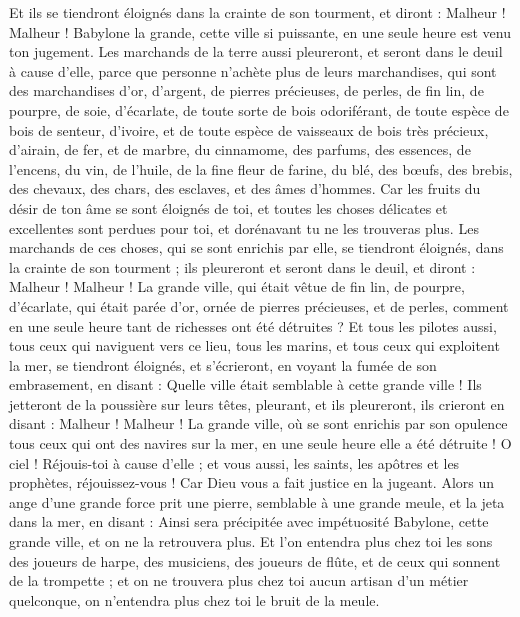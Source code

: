 \begin{multicols}{2}
Et ils se tiendront éloignés dans la crainte de son tourment, et diront : Malheur ! Malheur ! Babylone la grande, cette ville si puissante, en une seule heure est venu ton jugement.
Les marchands de la terre aussi pleureront, et seront dans le deuil à cause d'elle, parce que personne n'achète plus de leurs marchandises,
qui sont des marchandises d'or, d'argent, de pierres précieuses, de perles, de fin lin, de pourpre, de soie, d'écarlate, de toute sorte de bois odoriférant, de toute espèce de bois de senteur, d'ivoire, et de toute espèce de vaisseaux de bois très précieux, d'airain, de fer, et de marbre,
du cinnamome, des parfums, des essences, de l'encens, du vin, de l'huile, de la fine fleur de farine, du blé, des bœufs, des brebis, des chevaux, des chars, des esclaves, et des âmes d'hommes.
Car les fruits du désir de ton âme se sont éloignés de toi, et toutes les choses délicates et excellentes sont perdues pour toi, et dorénavant tu ne les trouveras plus.
Les marchands de ces choses, qui se sont enrichis par elle, se tiendront éloignés, dans la crainte de son tourment ; ils pleureront et seront dans le deuil,
et diront : Malheur ! Malheur ! La grande ville, qui était vêtue de fin lin, de pourpre, d'écarlate, qui était parée d'or, ornée de pierres précieuses, et de perles, comment en une seule heure tant de richesses ont été détruites ?
Et tous les pilotes aussi, tous ceux qui naviguent vers ce lieu, tous les marins, et tous ceux qui exploitent la mer, se tiendront éloignés,
et s’écrieront, en voyant la fumée de son embrasement, en disant : Quelle ville était semblable à cette grande ville !
Ils jetteront de la poussière sur leurs têtes, pleurant, et ils pleureront, ils crieront en disant : Malheur ! Malheur ! La grande ville, où se sont enrichis par son opulence tous ceux qui ont des navires sur la mer, en une seule heure elle a été détruite !
O ciel ! Réjouis-toi à cause d'elle ; et vous aussi, les saints, les apôtres et les prophètes, réjouissez-vous ! Car Dieu vous a fait justice en la jugeant.
Alors un ange d'une grande force prit une pierre, semblable à une grande meule, et la jeta dans la mer, en disant : Ainsi sera précipitée avec impétuosité Babylone, cette grande ville, et on ne la retrouvera plus{}.
Et l’on entendra plus chez toi les sons des joueurs de harpe, des musiciens, des joueurs de flûte, et de ceux qui sonnent de la trompette ; et on ne trouvera plus chez toi aucun artisan d’un métier quelconque, on n’entendra plus chez toi le bruit de la meule.

\end{multicols}
